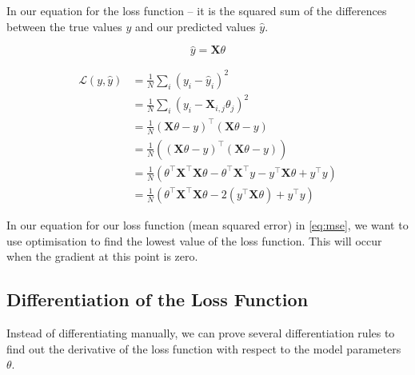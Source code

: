 In our equation for the loss function – it is the squared sum of the differences between the true values $y$ and our predicted values $\hat{y}$.

\[
    \hat{y} = \mathbf{X} \theta
\]

\begin{align}
    \mathcal{L}(y, \hat{y}) & = \frac{1}{N} \sum_i \left( y_i - \hat{y}_i \right)^2                                                                                            \\
                            & = \frac{1}{N} \sum_i \left( y_i - \mathbf{X}_{i,j} \theta_j \right)^2                                                                            \\
                            & = \frac{1}{N} (\mathbf{X}\theta - y)^\top (\mathbf{X}\theta - y)                                                                                 \\
                            & = \frac{1}{N} \left( (\mathbf{X}\theta - y)^\top (\mathbf{X}\theta - y) \right)                                                                  \\
                            & = \frac{1}{N} \left( \theta^\top \mathbf{X}^\top \mathbf{X} \theta - \theta^\top \mathbf{X}^\top y - y^\top \mathbf{X} \theta + y^\top y \right) \\
                            & = \frac{1}{N} \left( \theta^\top \mathbf{X}^\top \mathbf{X} \theta - 2 (y^\top \mathbf{X} \theta) + y^\top y \right) \label{eq:mse}
\end{align}

In our equation for our loss function (mean squared error) in \eqref{eq:mse}, we want to use optimisation to find the lowest value of the loss function. This will occur when the gradient at this point is zero.

\subsection{Differentiation of the Loss Function}

Instead of differentiating manually, we can prove several differentiation rules to find out the derivative of the loss function with respect to the model parameters $\theta$.


